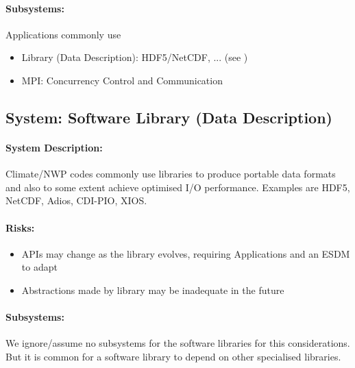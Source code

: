 \paragraph{Subsystems:}
Applications commonly use

\begin{itemize}
	\item Library (Data Description): HDF5/NetCDF, ...  (see )
	\item MPI: Concurrency Control and Communication %
\end{itemize}

\subsection{System: Software Library (Data Description)}
\label{System: Library}


\paragraph{System Description:}
Climate/NWP codes commonly use libraries to produce portable data formats and also to some extent achieve optimised I/O performance.
Examples are HDF5, NetCDF, Adios, CDI-PIO, XIOS.


\paragraph{Risks:}
\begin{itemize}
	\item APIs may change as the library evolves, requiring Applications and an ESDM to adapt
	\item Abstractions made by library may be inadequate in the future
\end{itemize}


\paragraph{Subsystems:}
We ignore/assume no subsystems for the software libraries for this considerations.
But it is common for a software library to depend on other specialised libraries.




